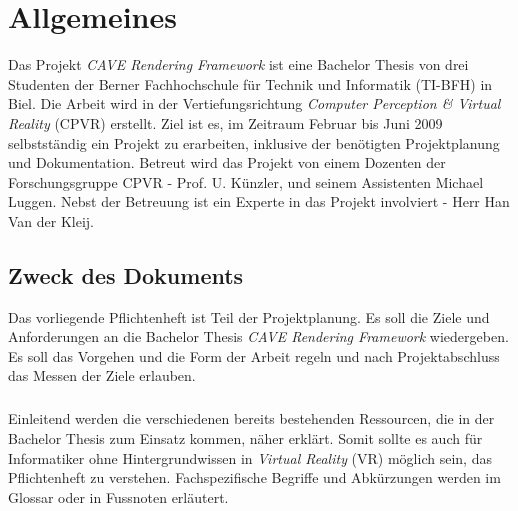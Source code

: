 \chapter{Allgemeines}
Das Projekt \textit{CAVE Rendering Framework} ist eine Bachelor Thesis von drei Studenten der Berner Fachhochschule f\"ur Technik und Informatik (TI-BFH) in Biel. Die Arbeit wird in der Vertiefungsrichtung \textit{Computer Perception \& Virtual Reality} (CPVR) erstellt.
Ziel ist es, im Zeitraum Februar bis Juni 2009 selbstst\"andig ein Projekt zu erarbeiten, inklusive der ben\"otigten Projektplanung und Dokumentation.
Betreut wird das Projekt von einem Dozenten der Forschungsgruppe CPVR - Prof. U. K\"unzler, und seinem Assistenten Michael Luggen. Nebst der Betreuung ist ein Experte in das Projekt involviert - Herr Han Van der Kleij. 

\section{Zweck des Dokuments}
Das vorliegende Pflichtenheft ist Teil der Projektplanung. Es soll die Ziele und Anforderungen an die Bachelor Thesis \textit{CAVE Rendering Framework} wiedergeben. Es soll das Vorgehen und die Form der Arbeit regeln und nach Projektabschluss das Messen der Ziele erlauben.

\paragraph{}
Einleitend werden die verschiedenen bereits bestehenden Ressourcen, die in der Bachelor Thesis zum Einsatz kommen, n\"aher erkl\"art. Somit sollte es auch f\"ur Informatiker ohne Hintergrundwissen in \textit{Virtual Reality} (VR) m\"oglich sein, das Pflichtenheft zu verstehen. Fachspezifische Begriffe und Abk\"urzungen werden im Glossar oder in Fussnoten erl\"autert.
